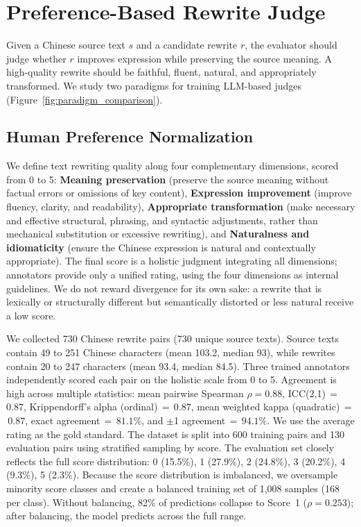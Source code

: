 \documentclass[11pt]{article}
\begin{document}
\section{Preference-Based Rewrite Judge}
\label{sec:method}

Given a Chinese source text $s$ and a candidate rewrite $r$, the evaluator should judge whether $r$ improves expression while preserving the source meaning.
A high-quality rewrite should be faithful, fluent, natural, and appropriately transformed.
We study two paradigms for training LLM-based judges (Figure~\ref{fig:paradigm_comparison}).

\subsection{Human Preference Normalization}
\label{sec:data}

We define text rewriting quality along four complementary dimensions, scored from 0 to 5: \textbf{Meaning preservation} (preserve the source meaning without factual errors or omissions of key content), \textbf{Expression improvement} (improve fluency, clarity, and readability), \textbf{Appropriate transformation} (make necessary and effective structural, phrasing, and syntactic adjustments, rather than mechanical substitution or excessive rewriting), and \textbf{Naturalness and idiomaticity} (ensure the Chinese expression is natural and contextually appropriate).
The final score is a holistic judgment integrating all dimensions; annotators provide only a unified rating, using the four dimensions as internal guidelines.
We do not reward divergence for its own sake: a rewrite that is lexically or structurally different but semantically distorted or less natural receive a low score.

We collected 730 Chinese rewrite pairs (730 unique source texts).
Source texts contain 49 to 251 Chinese characters (mean 103.2, median 93), while rewrites contain 20 to 247 characters (mean 93.4, median 84.5).
Three trained annotators independently scored each pair on the holistic scale from 0 to 5.
Agreement is high across multiple statistics: mean pairwise Spearman $\rho = 0.88$, ICC(2,1)\,$=$\,$0.87$, Krippendorff's alpha (ordinal)\,$=$\,$0.87$, mean weighted kappa (quadratic)\,$=$\,$0.87$, exact agreement\,$=$\,$81.1\%$, and $\pm$1 agreement\,$=$\,$94.1\%$.
We use the average rating as the gold standard.
The dataset is split into 600 training pairs and 130 evaluation pairs using stratified sampling by score.
The evaluation set closely reflects the full score distribution: 0 (15.5\%), 1 (27.9\%), 2 (24.8\%), 3 (20.2\%), 4 (9.3\%), 5 (2.3\%).
Because the score distribution is imbalanced, we oversample minority score classes and create a balanced training set of 1,008 samples (168 per class).
Without balancing, 82\% of predictions collapse to Score~1 ($\rho=0.253$); after balancing, the model predicts across the full range.
\end{document}
